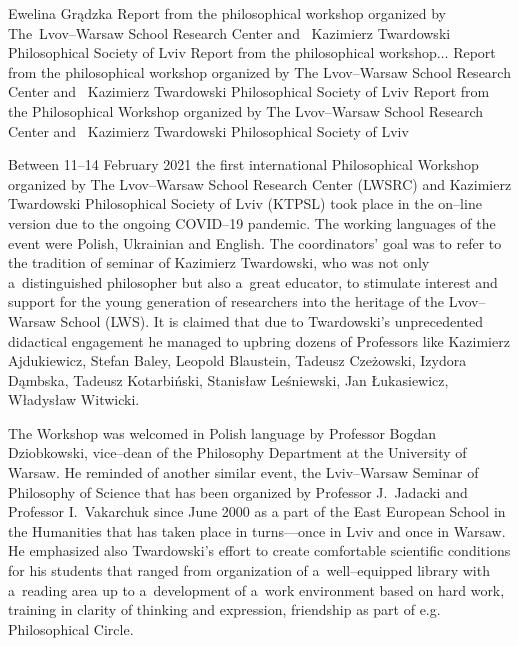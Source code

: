 \begin{editorialeng}{Ewelina Grądzka}
	{Report from the philosophical workshop organized by The~Lvov--Warsaw School Research Center and ~Kazimierz Twardowski Philosophical Society of Lviv}
	{Report from the philosophical workshop$\ldots$}
	{Report from the philosophical workshop organized by The Lvov--Warsaw School Research Center and ~Kazimierz Twardowski Philosophical Society of Lviv}
	{Report from the Philosophical Workshop organized by The Lvov--Warsaw School Research Center and ~Kazimierz Twardowski Philosophical Society of Lviv}



Between 11--14 February 2021 the first international Philosophical Workshop organized by The Lvov--Warsaw School Research Center (LWSRC) and Kazimierz Twardowski Philosophical Society of Lviv (KTPSL) took place in the on--line version due to the ongoing COVID--19 pandemic. The working languages of the event were Polish, Ukrainian and English. The coordinators’ goal was to refer to the tradition of seminar of Kazimierz Twardowski, who was not only a~distinguished philosopher but also a~great educator, to stimulate interest and support for the young generation of researchers into the heritage of the Lvov--Warsaw School (LWS). It is claimed that due to Twardowski’s unprecedented didactical engagement he managed to upbring dozens of Professors like Kazimierz Ajdukiewicz, Stefan Baley, Leopold Blaustein, Tadeusz Czeżowski, Izydora Dąmbska, Tadeusz Kotarbiński, Stanisław Leśniewski, Jan Łukasiewicz, Władysław Witwicki.

The Workshop was welcomed in Polish language by Professor Bogdan Dziobkowski, vice--dean of the Philosophy Department at the University of Warsaw. He reminded of another similar event, the Lviv--Warsaw Seminar of Philosophy of Science that has been organized by Professor J.~Jadacki and Professor I.~Vakarchuk since June 2000 as a part of the East European School in the Humanities that has taken place in turns---once in Lviv and once in Warsaw. He emphasized also Twardowski’s effort to create comfortable scientific conditions for his students that ranged from organization of a~well--equipped library with a~reading area up to a~development of a~work environment based on hard work, training in clarity of thinking and expression, friendship as part of e.g. Philosophical Circle.


\end{editorialeng}
